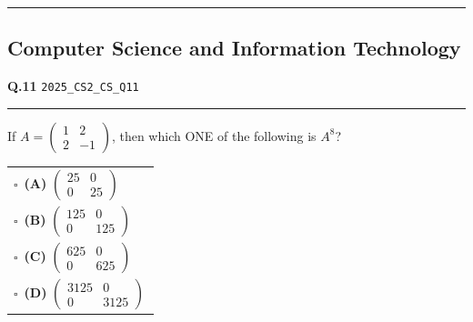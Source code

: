 \documentclass[a4paper,10pt]{article}
\begin{document}
\vspace{6pt}\hrule height 0.35pt\vspace{6pt}
\vspace{6pt}
\subsection*{Computer Science and Information Technology}
\vspace{-4pt}
\noindent
\begin{tcolorbox}[
    blanker,
    sidebyside,
    sidebyside align=top,
    lefthand width=0.55\textwidth,
    top=4pt, bottom=4pt, left=0pt, right=0pt,
    middle=16pt,
    underlay={
        \draw[dashed, black!80, line width=0.8pt, dash pattern=on 4pt off 3pt]
            ([xshift=0.55\textwidth+8pt]frame.north west) --
            ([xshift=0.55\textwidth+8pt]frame.south west);
    }
]
\textbf{Q.11}  \hfill {\tiny\texttt{2025\_CS2\_CS\_Q11}}
\vspace{2pt}\hrule height 0.3pt\vspace{4pt}

If $A = \begin{pmatrix} 1 & 2 \\ 2 & -1 \end{pmatrix}$, then which ONE of the following is $A^8$?

\par\vspace{6pt}\noindent
\begin{tabular}{@{}p{0.98\linewidth}@{}}
$\square$\ \textbf{(A)} $\begin{pmatrix} 25 & 0 \\ 0 & 25 \end{pmatrix}$ \\
\addlinespace[3pt]
$\square$\ \textbf{(B)} $\begin{pmatrix} 125 & 0 \\ 0 & 125 \end{pmatrix}$ \\
\addlinespace[3pt]
$\square$\ \textbf{(C)} $\begin{pmatrix} 625 & 0 \\ 0 & 625 \end{pmatrix}$ \\
\addlinespace[3pt]
$\square$\ \textbf{(D)} $\begin{pmatrix} 3125 & 0 \\ 0 & 3125 \end{pmatrix}$
\end{tabular}


\end{tcolorbox}
\end{document}

